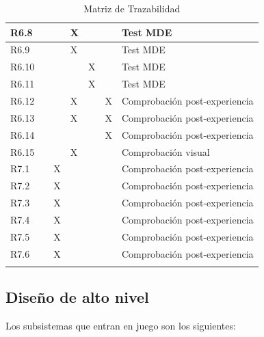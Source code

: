 \begin{longtable}[c]{|l|l|l|l|l|l|l|}
R6.8 &  &  & X &  &  & Test MDE \\ \hline
R6.9 &  &  & X &  &  & Test MDE \\ \hline
R6.10 &  &  &  & X &  & Test MDE \\ \hline
R6.11 &  &  &  & X &  & Test MDE \\ \hline
R6.12 &  &  & X &  & X & Comprobación post-experiencia \\ \hline
R6.13 &  &  & X &  & X & Comprobación post-experiencia \\ \hline
R6.14 &  &  &  &  & X & Comprobación post-experiencia \\ \hline
R6.15 &  &  & X &  &  & Comprobación visual \\ \hline
R7.1 &  & X &  &  &  & Comprobación post-experiencia \\ \hline
R7.2 &  & X &  &  &  & Comprobación post-experiencia \\ \hline
R7.3 &  & X &  &  &  & Comprobación post-experiencia \\ \hline
R7.4 &  & X &  &  &  & Comprobación post-experiencia \\ \hline
R7.5 &  & X &  &  &  & Comprobación post-experiencia \\ \hline
R7.6 &  & X &  &  &  & Comprobación post-experiencia \\ \hline
\caption{Matriz de Trazabilidad}
\label{tab:matrizTrazabilidad}\\
\end{longtable}

\normalsize


\subsection{Diseño de alto nivel}

Los subsistemas que entran en juego son los siguientes:

\footnotesize

\setlength\LTleft{0pt}
\setlength\LTright{0pt}

